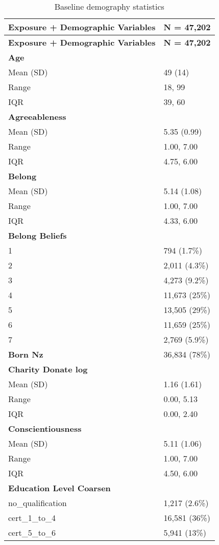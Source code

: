 \documentclass[
  singlecolumn]{article}
\begin{document}
\begin{longtable}[]{@{}ll@{}}
\caption{Baseline demography
statistics}\label{tbl-table-demography}\tabularnewline
\toprule\noalign{}
\textbf{Exposure + Demographic Variables} & \textbf{N = 47,202} \\
\midrule\noalign{}
\endfirsthead
\toprule\noalign{}
\textbf{Exposure + Demographic Variables} & \textbf{N = 47,202} \\
\midrule\noalign{}
\endhead
\bottomrule\noalign{}
\endlastfoot
\textbf{Age} & \\
Mean (SD) & 49 (14) \\
Range & 18, 99 \\
IQR & 39, 60 \\
\textbf{Agreeableness} & \\
Mean (SD) & 5.35 (0.99) \\
Range & 1.00, 7.00 \\
IQR & 4.75, 6.00 \\
\textbf{Belong} & \\
Mean (SD) & 5.14 (1.08) \\
Range & 1.00, 7.00 \\
IQR & 4.33, 6.00 \\
\textbf{Belong Beliefs} & \\
1 & 794 (1.7\%) \\
2 & 2,011 (4.3\%) \\
3 & 4,273 (9.2\%) \\
4 & 11,673 (25\%) \\
5 & 13,505 (29\%) \\
6 & 11,659 (25\%) \\
7 & 2,769 (5.9\%) \\
\textbf{Born Nz} & 36,834 (78\%) \\
\textbf{Charity Donate log} & \\
Mean (SD) & 1.16 (1.61) \\
Range & 0.00, 5.13 \\
IQR & 0.00, 2.40 \\
\textbf{Conscientiousness} & \\
Mean (SD) & 5.11 (1.06) \\
Range & 1.00, 7.00 \\
IQR & 4.50, 6.00 \\
\textbf{Education Level Coarsen} & \\
no\_qualification & 1,217 (2.6\%) \\
cert\_1\_to\_4 & 16,581 (36\%) \\
cert\_5\_to\_6 & 5,941 (13\%) \\

\end{longtable}
\end{document}
